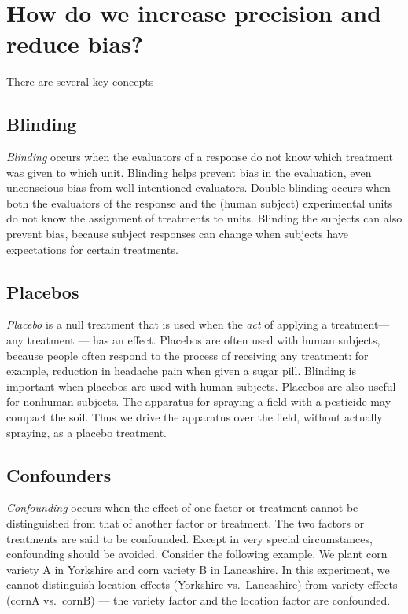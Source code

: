 \documentclass[
]{book}
\begin{document}
\hypertarget{how-do-we-increase-precision-and-reduce-bias}{%
\section{How do we increase precision and reduce bias?}\label{how-do-we-increase-precision-and-reduce-bias}}

There are several key concepts

\hypertarget{blinding}{%
\subsection{Blinding}\label{blinding}}

\emph{Blinding} occurs when the evaluators of a response do not know which treatment was given to which unit. Blinding helps prevent bias in the evaluation, even unconscious bias from well-intentioned evaluators. Double blinding occurs when both the evaluators of the response and the (human subject) experimental units do not know the assignment of treatments to units. Blinding the subjects can also prevent bias, because subject responses can change when subjects have expectations for certain treatments.

\hypertarget{placebos}{%
\subsection{Placebos}\label{placebos}}

\emph{Placebo} is a null treatment that is used when the \emph{act} of applying a treatment--- any treatment --- has an effect. Placebos are often used with human subjects, because people often respond to the process of receiving any treatment: for example,
reduction in headache pain when given a sugar pill. Blinding is important when placebos are used with human subjects. Placebos are also useful for nonhuman subjects. The apparatus for spraying a field with a pesticide may compact the soil. Thus we drive the apparatus over the field, without actually spraying, as a placebo treatment.

\hypertarget{confounders}{%
\subsection{Confounders}\label{confounders}}

\emph{Confounding} occurs when the effect of one factor or treatment cannot be distinguished from that of another factor or treatment. The two factors or treatments are said to be confounded. Except in very special circumstances, confounding should be avoided. Consider the following example. We plant corn variety A in Yorkshire and corn variety B in Lancashire. In this experiment, we cannot distinguish location effects (Yorkshire vs.~Lancashire) from variety effects (cornA vs.~cornB) --- the variety factor and the location factor are confounded.
\end{document}
